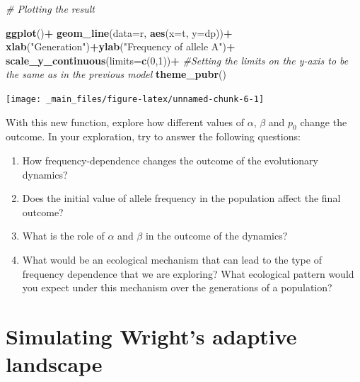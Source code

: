 \documentclass[
]{book}
\newenvironment{Shaded}{\begin{snugshade}}{\end{snugshade}}
\newcommand{\AttributeTok}[1]{\textcolor[rgb]{0.13,0.29,0.53}{#1}}
\newcommand{\CommentTok}[1]{\textcolor[rgb]{0.56,0.35,0.01}{\textit{#1}}}
\newcommand{\DecValTok}[1]{\textcolor[rgb]{0.00,0.00,0.81}{#1}}
\newcommand{\FunctionTok}[1]{\textcolor[rgb]{0.13,0.29,0.53}{\textbf{#1}}}
\newcommand{\NormalTok}[1]{#1}
\newcommand{\SpecialCharTok}[1]{\textcolor[rgb]{0.81,0.36,0.00}{\textbf{#1}}}
\newcommand{\StringTok}[1]{\textcolor[rgb]{0.31,0.60,0.02}{#1}}
\begin{document}
\begin{Shaded}
\begin{Highlighting}[]
\CommentTok{\# Plotting the result}

\FunctionTok{ggplot}\NormalTok{()}\SpecialCharTok{+}
  \FunctionTok{geom\_line}\NormalTok{(}\AttributeTok{data=}\NormalTok{r, }\FunctionTok{aes}\NormalTok{(}\AttributeTok{x=}\NormalTok{t, }\AttributeTok{y=}\NormalTok{dp))}\SpecialCharTok{+}
  \FunctionTok{xlab}\NormalTok{(}\StringTok{"Generation"}\NormalTok{)}\SpecialCharTok{+}\FunctionTok{ylab}\NormalTok{(}\StringTok{"Frequency of allele A"}\NormalTok{)}\SpecialCharTok{+}
  \FunctionTok{scale\_y\_continuous}\NormalTok{(}\AttributeTok{limits=}\FunctionTok{c}\NormalTok{(}\DecValTok{0}\NormalTok{,}\DecValTok{1}\NormalTok{))}\SpecialCharTok{+} \CommentTok{\#Setting the limits on the y{-}axis to be the same as in the previous model}
  \FunctionTok{theme\_pubr}\NormalTok{()}
\end{Highlighting}
\end{Shaded}

\texttt{[image: \_main\_files/figure-latex/unnamed-chunk-6-1]}

With this new function, explore how different values of \(\alpha\), \(\beta\) and \(p_{0}\) change the outcome. In your exploration, try to answer the following questions:

\begin{enumerate}
\def\labelenumi{\arabic{enumi}.}
\item
  How frequency-dependence changes the outcome of the evolutionary dynamics?
\item
  Does the initial value of allele frequency in the population affect the final outcome?
\item
  What is the role of \(\alpha\) and \(\beta\) in the outcome of the dynamics?
\item
  What would be an ecological mechanism that can lead to the type of frequency dependence that we are exploring? What ecological pattern would you expect under this mechanism over the generations of a population?
\end{enumerate}

\hypertarget{simulating-wrights-adaptive-landscape}{%
\section{Simulating Wright's adaptive landscape}\label{simulating-wrights-adaptive-landscape}}
\end{document}
